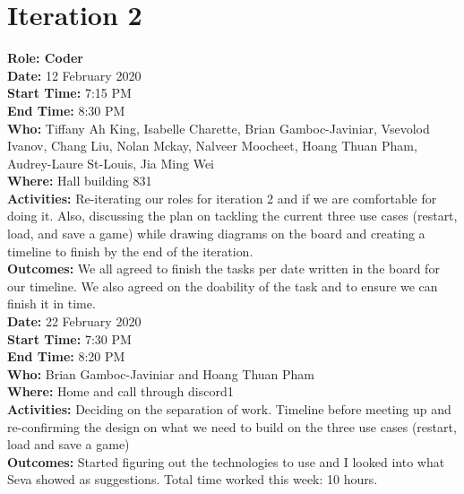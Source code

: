 \documentclass[12pt]{article}
\begin{document}

\section{Iteration 2}

\textbf{Role: Coder}\\

{\bf Date:} 12 February 2020\\
{\bf Start Time:} 7:15 PM\\
{\bf End Time:} 8:30 PM \\
{\bf Who:} Tiffany Ah King, Isabelle Charette, Brian Gamboc-Javiniar, Vsevolod Ivanov, Chang Liu, Nolan Mckay, Nalveer Moocheet, Hoang Thuan Pham, Audrey-Laure St-Louis, Jia Ming Wei\\
{\bf Where:} Hall building 831 \\
{\bf Activities:} Re-iterating our roles for iteration 2 and if we are comfortable for doing it. Also, discussing the plan on tackling the current three use cases (restart, load, and save a game) while drawing diagrams on the board and creating a timeline to finish by the end of the iteration. \\
{\bf Outcomes:} We all agreed to finish the tasks per date written in the board for our timeline. We also agreed on the doability of the task and to ensure we can finish it in time. \\

{\bf Date:} 22 February 2020\\
{\bf Start Time:} 7:30 PM\\
{\bf End Time:} 8:20 PM \\
{\bf Who:} Brian Gamboc-Javiniar and Hoang Thuan Pham \\
{\bf Where:} Home and call through discord1 \\
{\bf Activities:} Deciding on the separation of work. Timeline before meeting up and re-confirming the design on what we need to build on the three use cases (restart, load and save a game) \\
{\bf Outcomes:} Started figuring out the technologies to use and I looked into what Seva showed as suggestions. Total time worked this week: 10 hours.\\
\end{document}
